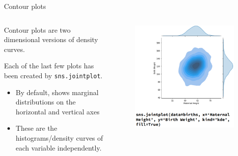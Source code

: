 \documentclass[aspectratio=169]{../latex_main/tntbeamer}  %
\begin{document}
	
	
	
	\begin{frame}{Contour plots}
	    \begin{columns}
            \begin{column}{.5\textwidth}
            Contour plots are two dimensional versions of density curves.
            
            \bigskip
            Each of the last few plots has been created by \texttt{sns.jointplot}.
            \begin{itemize}
                \item By default, shows marginal distributions on the horizontal and vertical axes
                \item These are the histograms/density curves of each variable independently.
            \end{itemize}
            \end{column}
            
            
            \begin{column}{.5\textwidth}
               \begin{figure}
                       \includegraphics[scale=.35]{Bild49}
                \end{figure}
            \end{column}
        \end{columns}
	\end{frame}
	
\end{document}
